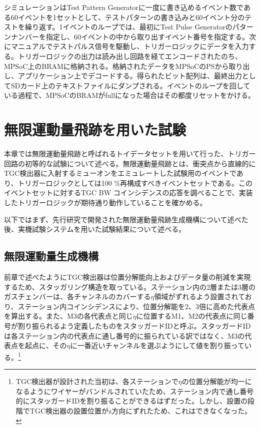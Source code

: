 シミュレーションはTest Pattern Generatorに一度に書き込めるイベント数である60イベントを1セットとして、テストパターンの書き込みと60イベント分のテストを繰り返す。1イベントのループでは、最初にTest Pulse Generatorのパターンナンバーを指定し、60イベントの中から取り出すイベント番号を指定する。次にマニュアルでテストパルス信号を駆動し、トリガーロジックにデータを入力する。トリガーロジックの出力は読み出し回路を経てエンコードされたのち、MPSoC上のBRAMに格納される。格納されたデータをMPSoCのPSから取り出し、アプリケーション上でデコードする。得られたビット配列は、最終出力としてSDカード上のテキストファイルにダンプされる。イベントのループを回している過程で、MPSoCのBRAMがfullになった場合はその都度リセットをかける。

\section{無限運動量飛跡を用いた試験}
\label{sec_IMT}

本章では無限運動量飛跡と呼ばれるトイデータセットを用いて行った、トリガー回路の初等的な試験について述べる。無限運動量飛跡とは、衝突点から直線的にTGC検出器に入射するミューオンをエミュレートした試験用のイベントであり、トリガーロジックとしては100 \%再構成すべきイベントセットである。このイベントセットに対するTGC BW コインシデンスの応答を調べることで、実装したトリガーロジックが期待通り動作していることを確かめる。

以下ではまず、先行研究で開発された無限運動量飛跡生成機構について述べた後、実機試験システムを用いた試験結果について述べる。

\subsection{無限運動量生成機構}
\label{subsec_IMT_generation}

前章で述べたようにTGC検出器は位置分解能向上およびデータ量の削減を実現するため、スタッガリング構造を取っている。ステーション内の2層または3層のガスチェンバーは、各チャンネルのカバーする$\eta$領域がずれるよう設置されており、ステーション内コインシデンスにより、位置分解能を2、3倍に高めた代表点を算出する。また、M3の各代表点と同じ$\eta$に位置するM1、M2の代表点に同じ番号が割り振られるよう定義したものをスタッガードIDと呼ぶ。スタッガードIDは各ステーション内の代表点に通し番号的に振られている訳ではなく、M3の代表点を起点に、その$\eta$に一番近いチャンネルを選ぶようにして値を割り振っている。\footnote{TGC検出器が設計された当初は、各ステーションで$\eta$の位置分解能が均一になるようにワイヤーがバンドルされていたため、ステーション内で通し番号的にスタッガードIDを割り振ることができるはずだった。しかし、設置の段階でTGC検出器の設置位置がz方向にずれたため、これはできなくなった。}

